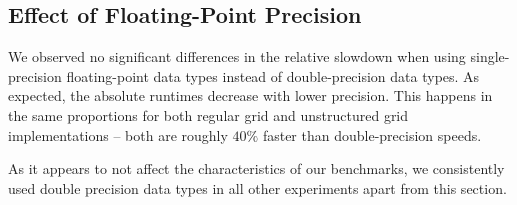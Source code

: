 \subsection{Effect of Floating-Point Precision}

We observed no significant differences in the relative slowdown when using single-precision floating-point data types instead of double-precision data types. As expected, the absolute runtimes decrease with lower precision. This happens in the same proportions for both regular grid and unstructured grid implementations -- both are roughly $40\%$ faster than double-precision speeds.

As it appears to not affect the characteristics of our benchmarks, we consistently used double precision data types in all other experiments apart from this section.